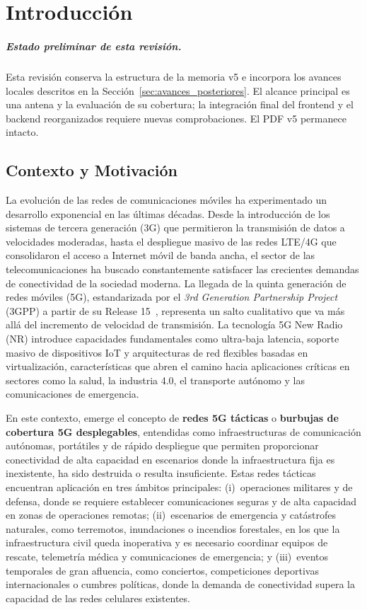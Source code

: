 \chapter{Introducción}
\label{cap:capitulo1}
\setcounter{page}{1}

\paragraph{Estado preliminar de esta revisión.}
Esta revisión conserva la estructura de la memoria v5 e incorpora los avances
locales descritos en la Sección~\ref{sec:avances_posteriores}. El alcance principal
es una antena y la evaluación de su cobertura; la integración final del frontend
y el backend reorganizados requiere nuevas comprobaciones. El PDF v5 permanece intacto.

\section{Contexto y Motivación}
\label{sec:contexto}

La evolución de las redes de comunicaciones móviles ha experimentado un desarrollo exponencial en las últimas décadas. Desde la introducción de los sistemas de tercera generación (3G) que permitieron la transmisión de datos a velocidades moderadas, hasta el despliegue masivo de las redes LTE/4G que consolidaron el acceso a Internet móvil de banda ancha, el sector de las telecomunicaciones ha buscado constantemente satisfacer las crecientes demandas de conectividad de la sociedad moderna. La llegada de la quinta generación de redes móviles (5G), estandarizada por el \textit{3rd Generation Partnership Project} (3GPP) a partir de su Release 15~\cite{3gpp_rel15_2018}, representa un salto cualitativo que va más allá del incremento de velocidad de transmisión. La tecnología 5G New Radio (NR) introduce capacidades fundamentales como ultra-baja latencia, soporte masivo de dispositivos IoT y arquitecturas de red flexibles basadas en virtualización, características que abren el camino hacia aplicaciones críticas en sectores como la salud, la industria 4.0, el transporte autónomo y las comunicaciones de emergencia.

En este contexto, emerge el concepto de \textbf{redes 5G tácticas} o \textbf{burbujas de cobertura 5G desplegables}, entendidas como infraestructuras de comunicación autónomas, portátiles y de rápido despliegue que permiten proporcionar conectividad de alta capacidad en escenarios donde la infraestructura fija es inexistente, ha sido destruida o resulta insuficiente. Estas redes tácticas encuentran aplicación en tres ámbitos principales: (i)~operaciones militares y de defensa, donde se requiere establecer comunicaciones seguras y de alta capacidad en zonas de operaciones remotas; (ii)~escenarios de emergencia y catástrofes naturales, como terremotos, inundaciones o incendios forestales, en los que la infraestructura civil queda inoperativa y es necesario coordinar equipos de rescate, telemetría médica y comunicaciones de emergencia; y (iii)~eventos temporales de gran afluencia, como conciertos, competiciones deportivas internacionales o cumbres políticas, donde la demanda de conectividad supera la capacidad de las redes celulares existentes.

